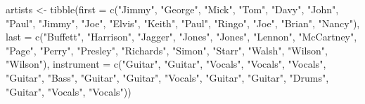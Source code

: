\documentclass[
]{book}
\newenvironment{Shaded}{\begin{snugshade}}{\end{snugshade}}
\newcommand{\AttributeTok}[1]{\textcolor[rgb]{0.77,0.63,0.00}{#1}}
\newcommand{\FunctionTok}[1]{\textcolor[rgb]{0.00,0.00,0.00}{#1}}
\newcommand{\NormalTok}[1]{#1}
\newcommand{\OtherTok}[1]{\textcolor[rgb]{0.56,0.35,0.01}{#1}}
\newcommand{\StringTok}[1]{\textcolor[rgb]{0.31,0.60,0.02}{#1}}
\begin{document}
\begin{Shaded}
\begin{Highlighting}[]
\NormalTok{artists }\OtherTok{\textless{}{-}} \FunctionTok{tibble}\NormalTok{(}\AttributeTok{first =} \FunctionTok{c}\NormalTok{(}\StringTok{"Jimmy"}\NormalTok{, }\StringTok{"George"}\NormalTok{, }\StringTok{"Mick"}\NormalTok{, }\StringTok{"Tom"}\NormalTok{, }\StringTok{"Davy"}\NormalTok{, }\StringTok{"John"}\NormalTok{,}
                            \StringTok{"Paul"}\NormalTok{, }\StringTok{"Jimmy"}\NormalTok{, }\StringTok{"Joe"}\NormalTok{, }\StringTok{"Elvis"}\NormalTok{, }\StringTok{"Keith"}\NormalTok{, }\StringTok{"Paul"}\NormalTok{, }
                            \StringTok{"Ringo"}\NormalTok{, }\StringTok{"Joe"}\NormalTok{, }\StringTok{"Brian"}\NormalTok{, }\StringTok{"Nancy"}\NormalTok{), }
                  \AttributeTok{last =} \FunctionTok{c}\NormalTok{(}\StringTok{"Buffett"}\NormalTok{, }\StringTok{"Harrison"}\NormalTok{, }\StringTok{"Jagger"}\NormalTok{, }\StringTok{"Jones"}\NormalTok{, }\StringTok{"Jones"}\NormalTok{, }
                           \StringTok{"Lennon"}\NormalTok{, }\StringTok{"McCartney"}\NormalTok{, }\StringTok{"Page"}\NormalTok{, }\StringTok{"Perry"}\NormalTok{, }\StringTok{"Presley"}\NormalTok{,}
                           \StringTok{"Richards"}\NormalTok{, }\StringTok{"Simon"}\NormalTok{, }\StringTok{"Starr"}\NormalTok{, }\StringTok{"Walsh"}\NormalTok{, }\StringTok{"Wilson"}\NormalTok{, }\StringTok{"Wilson"}\NormalTok{), }
                  \AttributeTok{instrument =} \FunctionTok{c}\NormalTok{(}\StringTok{"Guitar"}\NormalTok{, }\StringTok{"Guitar"}\NormalTok{, }\StringTok{"Vocals"}\NormalTok{, }\StringTok{"Vocals"}\NormalTok{, }\StringTok{"Vocals"}\NormalTok{,}
                                 \StringTok{"Guitar"}\NormalTok{, }\StringTok{"Bass"}\NormalTok{, }\StringTok{"Guitar"}\NormalTok{, }\StringTok{"Guitar"}\NormalTok{, }\StringTok{"Vocals"}\NormalTok{, }\StringTok{"Guitar"}\NormalTok{, }
                                 \StringTok{"Guitar"}\NormalTok{, }\StringTok{"Drums"}\NormalTok{, }\StringTok{"Guitar"}\NormalTok{, }\StringTok{"Vocals"}\NormalTok{, }\StringTok{"Vocals"}\NormalTok{))}



\end{Highlighting}
\end{Shaded}
\end{document}
